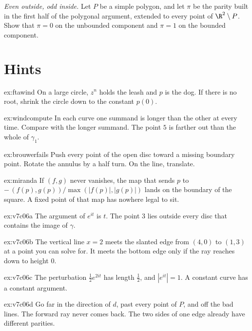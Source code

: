 \begin{exercise}[$\star\star$]\label{ex:v7c06d}
\emph{Even outside, odd inside.} Let $P$ be a simple polygon, and let $\pi$ be the parity built in the first half of the polygonal argument, extended to every point of $\R^2\setminus P$. Show that $\pi=0$ on the unbounded component and $\pi=1$ on the bounded component.
\end{exercise}

\section{Hints}

\begin{hint}{ex:ftawind}
On a large circle, $z^n$ holds the leash and $p$ is the dog. If there is no root, shrink the circle down to the constant $p(0)$.
\end{hint}
\begin{hint}{ex:windcompute}
In each curve one summand is longer than the other at every time. Compare with the longer summand. The point $5$ is farther out than the whole of $\gamma_1$.
\end{hint}
\begin{hint}{ex:brouwerfails}
Push every point of the open disc toward a missing boundary point. Rotate the annulus by a half turn. On the line, translate.
\end{hint}
\begin{hint}{ex:miranda}
If $(f,g)$ never vanishes, the map that sends $p$ to $-\,(f(p),g(p))/{\max(|f(p)|,|g(p)|)}$ lands on the boundary of the square. A fixed point of that map has nowhere legal to sit.
\end{hint}
\begin{hint}{ex:v7c06a}
The argument of $e^{it}$ is $t$. The point $3$ lies outside every disc that contains the image of $\gamma$.
\end{hint}
\begin{hint}{ex:v7c06b}
The vertical line $x=2$ meets the slanted edge from $(4,0)$ to $(1,3)$ at a point you can solve for. It meets the bottom edge only if the ray reaches down to height $0$.
\end{hint}
\begin{hint}{ex:v7c06c}
The perturbation $\frac12 e^{2it}$ has length $\frac12$, and $|e^{it}|=1$. A constant curve has a constant argument.
\end{hint}
\begin{hint}{ex:v7c06d}
Go far in the direction of $d$, past every point of $P$, and off the bad lines. The forward ray never comes back. The two sides of one edge already have different parities.
\end{hint}


